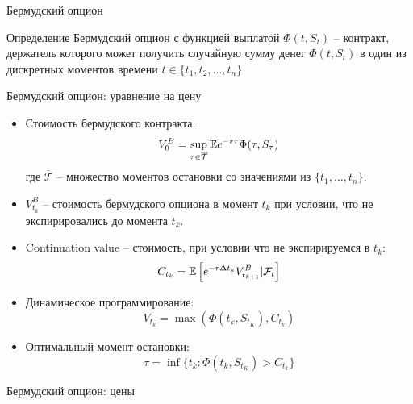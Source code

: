 \documentclass[aspectratio=169]{beamer}
\begin{document}
\begin{frame}{Бермудский опцион}
    \begin{block}{Определение}
Бермудский опцион с функцией выплатой $\Phi(t, S_t)$ -- контракт, 
        держатель которого может получить случайную сумму денег $\Phi(t, S_t)$ 
        в один из дискретных моментов времени $t\in\{t_1, t_2, \ldots, t_n\}$
    \end{block}

\end{frame}
\begin{frame}{Бермудский опцион: уравнение на цену}
    \begin{itemize}
        \item Стоимость бермудского контракта:
        $$
            V_0^B = \sup_{\tau \in \overline{\mathcal{T}}} \mathbb{E} e^{-r\tau} \Phi(\tau, S_{\tau})
        $$где $\overline{\mathcal{T}}$ -- множество моментов остановки со значениями из $\{t_1, \ldots, t_n\}$.
        \item $V_{t_k}^B$ -- стоимость бермудского опциона в момент $t_k$ при условии, что не экспирировались до момента $t_k$.
        \item Continuation value -- стоимость, при условии что не экспирируемся в $t_k$:
        $$
            C_{t_k} = \mathbb{E}\left[ e^{-r \Delta t_k} V_{t_{k+1}}^B | \mathcal{F}_t \right]
        $$
        \item Динамическое программирование:
        $$
            V_{t_k} = \max(\Phi(t_k, S_{t_K}), C_{t_k})
        $$
        \item Оптимальный момент остановки:
        $$
            \tau = \inf\{t_k : \Phi(t_k, S_{t_K}) > C_{t_k} \}
        $$
    \end{itemize}
\end{frame}

\begin{frame}{Бермудский опцион: цены}
    \centering
\end{frame}
\end{document}
